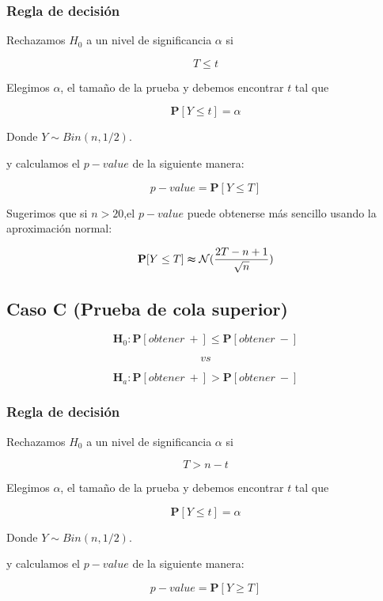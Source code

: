 \documentclass[
  a4paper,
  oneside,
  openany]{book}
\begin{document}
\hypertarget{regla-de-decisiuxf3n-11}{%
\subsubsection*{Regla de decisión}\label{regla-de-decisiuxf3n-11}}


Rechazamos \(H_0\) a un nivel de significancia \(\alpha\) si

\[T \leq t\]

Elegimos \(\alpha\), el tamaño de la prueba y debemos encontrar \(t\) tal que

\[\mathbf{P}[Y \leq t]=\alpha\]

Donde \(Y \sim Bin (n,1/2)\).

y calculamos el \(p-value\) de la siguiente manera:

\[p-value=\mathbf{P}[Y\leq T]\]

Sugerimos que si \(n>20\),el \(p-value\) puede obtenerse más sencillo usando la aproximación normal:

\[\mathbf{P}[Y\leq T] \thickapprox  \mathcal{N} (\frac{2T-n+1}{\sqrt{n}})\]

\hypertarget{caso-c-prueba-de-cola-superior-2}{%
\subsection*{Caso C (Prueba de cola superior)}\label{caso-c-prueba-de-cola-superior-2}}


\[\textbf{H}_0: \mathbf{P}[obtener\ +] \leq \mathbf{P}[obtener\ -]\]

\[vs\]

\[\textbf{H}_a: \mathbf{P}[obtener\ +] > \mathbf{P}[obtener\ -]\]

\hypertarget{regla-de-decisiuxf3n-12}{%
\subsubsection*{Regla de decisión}\label{regla-de-decisiuxf3n-12}}


Rechazamos \(H_0\) a un nivel de significancia \(\alpha\) si

\[T > n-t \]

Elegimos \(\alpha\), el tamaño de la prueba y debemos encontrar \(t\) tal que

\[\mathbf{P}[Y \leq t]=\alpha\]

Donde \(Y \sim Bin (n,1/2)\).

y calculamos el \(p-value\) de la siguiente manera:

\[p-value=\mathbf{P}[Y\geq T]\]
\end{document}
